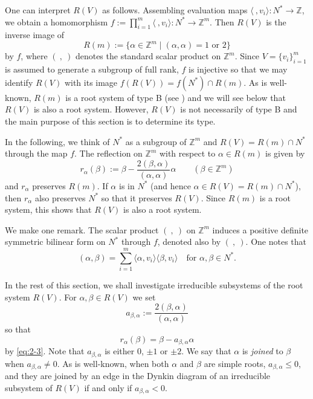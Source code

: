 \documentclass[12pt]{amsart}
\theoremstyle{plain} \numberwithin{equation}{section}
\theoremstyle{definition}
\def\Z{\mathbb Z}
\def\MV{V}
\begin{document}
One can interpret $R(\MV)$ as follows.  Assembling evaluation maps $\langle\ ,v_i\rangle\colon N^*\to \Z$, we obtain a homomorphism $f:=\prod_{i=1}^m\langle\ ,v_i\rangle\colon N^*\to \Z^m$.  Then $R(\MV)$ is the inverse image of 
\begin{equation*} \label{eq:2-2}
R(m):=\{ \alpha\in \Z^m\mid (\alpha,\alpha)=1\text{ or }2\}
\end{equation*}
by $f$, where $(\ ,\ )$ denotes the standard scalar product on $\Z^m$.  Since $\MV=\{v_i\}_{i=1}^m$ is assumed to generate a subgroup of full rank, $f$ is injective so that we may identify $R(\MV)$ with its image $f(R(\MV))=f(N^*)\cap R(m)$.  As is well-known, $R(m)$ is a root system of type B (see \cite[p.64]{hump72}) and we will see below that $R(\MV)$ is also a root system.  However, $R(\MV)$ is not necessarily of type B and the main purpose of this section is to determine its type.  

In the following, we think of $N^*$ as a subgroup of $\Z^m$ and $R(\MV)=R(m)\cap N^*$ through the map $f$.  The reflection on $\Z^m$ with respect to $\alpha\in R(m)$ is given by 
\begin{equation} \label{eq:2-3}
r_\alpha(\beta):=\beta-\frac{2(\beta,\alpha)}{(\alpha,\alpha)}\alpha \qquad (\beta\in \Z^m)
\end{equation}
and $r_\alpha$ preserves $R(m)$.  If $\alpha$ is in $N^*$ (and hence $\alpha\in R(\MV)=R(m)\cap N^*$), then $r_\alpha$ also preserves $N^*$ so that it preserves $R(\MV)$.  Since $R(m)$ is a root system, this shows that $R(\MV)$ is also a root system.%

We make one remark.  The scalar product $(\ ,\ )$ on $\Z^m$ induces a positive definite symmetric bilinear form on $N^*$ through $f$, denoted also by $(\ ,\ )$.  One notes that 
\begin{equation} \label{eq:2-4}
(\alpha,\beta)=\sum_{i=1}^m \langle \alpha, v_i\rangle\langle \beta,v_i\rangle\quad\text{for $\alpha,\beta\in N^*$}.
\end{equation}


In the rest of this section, we shall investigate irreducible subsystems of the root system $R(\MV)$. For $\alpha,\beta\in R(\MV)$ we set
\begin{equation} \label{eq:2-7}
a_{\beta,\alpha}:=\frac{2(\beta,\alpha)}{(\alpha,\alpha)} 
\end{equation}
so that 
\[
r_\alpha(\beta)=\beta-a_{\beta,\alpha}\alpha
\]
by \eqref{eq:2-3}. Note that $a_{\beta,\alpha}$ is either $0$, $\pm 1$ or $\pm 2$.  
We say that $\alpha$ is \emph{joined} to $\beta$ when $a_{\beta,\alpha}\not=0$.  As is well-known, when both $\alpha$ and $\beta$ are simple roots, $a_{\beta,\alpha}\le 0$, and they are joined by an edge in the Dynkin diagram of an irreducible subsystem of $R(\MV)$ if and only if $a_{\beta,\alpha}<0$.  
\end{document}
